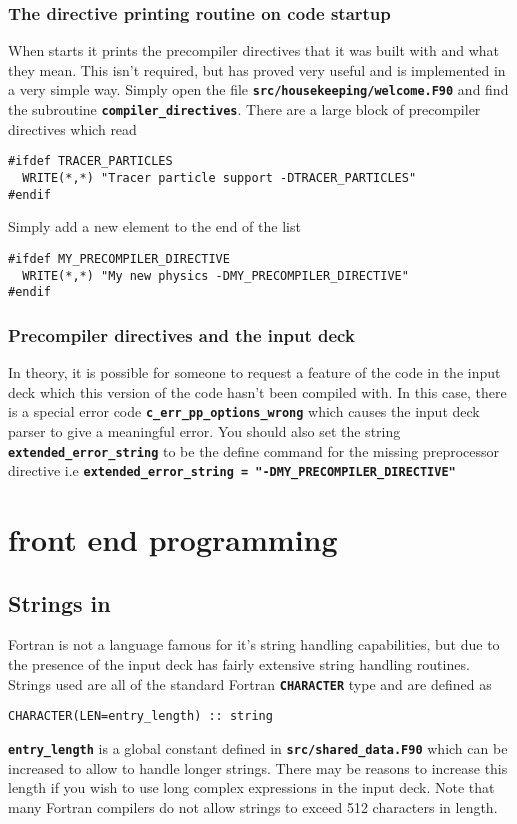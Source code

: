 \documentclass[12pt,a4paper]{article}
\newcommand{\simpleboxverbatim}{\begin{Verbatim}[obeytabs=true,frame=single,
  framerule=0.5mm,rulecolor=\color{warwickmid},formatcom=\color{black}]}
\newcommand{\inlinecode}[1]{{\color{warwickred} \bf\texttt{#1}}}
\newcommand{\EPOCH}{{\color{warwickdark}\fontfamily{phv}\selectfont{EPOCH}}}
\begin{document}
\subsubsection{The directive printing routine on code startup}
When {\EPOCH} starts it prints the precompiler directives that it was built with
and what they mean. This isn't required, but has proved very useful and is
implemented in a very simple way.  Simply open the file
\inlinecode{src/housekeeping/welcome.F90} and find the subroutine
\inlinecode{compiler\_directives}. There are a large block of precompiler
directives which read

\simpleboxverbatim
#ifdef TRACER_PARTICLES
  WRITE(*,*) "Tracer particle support -DTRACER_PARTICLES"
#endif
\end{Verbatim}

Simply add a new element to the end of the list
\simpleboxverbatim
#ifdef MY_PRECOMPILER_DIRECTIVE
  WRITE(*,*) "My new physics -DMY_PRECOMPILER_DIRECTIVE"
#endif
\end{Verbatim}

\subsubsection{Precompiler directives and the input deck}
In theory, it is possible for someone to request a feature of the code in the
input deck which this version of the code hasn't been compiled with. In this
case, there is a special error code \inlinecode{c\_err\_pp\_options\_wrong} which
causes the input deck parser to give a meaningful error. You should also set
the string \inlinecode{extended\_error\_string} to be the define command for
the missing preprocessor directive i.e
\inlinecode{extended\_error\_string = "-DMY\_PRECOMPILER\_DIRECTIVE"}

\section{{\EPOCH} front end programming}

\subsection{Strings in {\EPOCH}}
Fortran is not a language famous for it's string handling capabilities, but due
to the presence of the input deck {\EPOCH} has fairly extensive string handling
routines. Strings used are all of the standard Fortran \inlinecode{CHARACTER}
type and are defined as
\simpleboxverbatim
CHARACTER(LEN=entry_length) :: string
\end{Verbatim}
\inlinecode{entry\_length} is a global constant defined in
\inlinecode{src/shared\_data.F90} which can be increased to allow {\EPOCH} to
handle longer strings. There may be reasons to increase this length if you wish
to use long complex expressions in the input deck. Note that many Fortran
compilers do not allow strings to exceed 512 characters in length.
\end{document}
